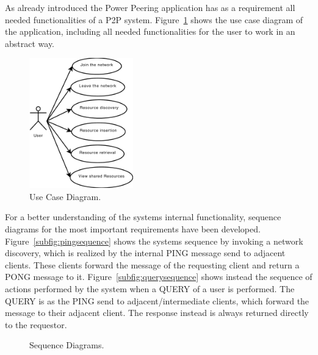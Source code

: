 \documentclass{article}
\begin{document}
As already introduced the Power Peering application has as a requirement all
needed functionalities of a P2P system. Figure~\ref{fig:usecasedia} shows the
use case diagram of the application, including all needed functionalities for
the user to work in an abstract way.
\begin{figure}[!hbtp]
\centering
\includegraphics[width=0.4\textwidth]{../img/UseCaseDiagram.pdf}
\caption{Use Case Diagram.}
\label{fig:usecasedia}
\end{figure}
For a better understanding of the systems internal functionality, sequence
diagrams for the most important requirements have been developed.
Figure~\ref{subfig:pingsequence} shows the systems sequence by invoking a
network discovery, which is realized by the internal PING message send to
adjacent clients. These clients forward the message of the requesting
client and return a PONG message to it. Figure~\ref{subfig:querysequence} shows
instead the sequence of actions performed by the system when a QUERY of a user
is performed. The QUERY is as the PING send to adjacent/intermediate clients,
which forward the message to their adjacent client. The response instead is
always returned directly to the requestor.
\begin{figure}[!hbtp]
\centering
{}
\caption{Sequence Diagrams.}
\label{fig:sequencediagrams}
\end{figure}
\end{document}
